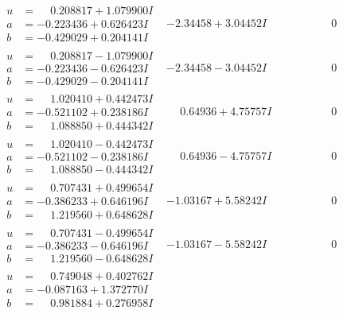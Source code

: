 \documentclass[1p]{elsarticle_modified}
\theoremstyle{definition}
\begin{document}
$$\begin{array}{c|c|c}
\begin{aligned}
u &= \phantom{-}0.208817 + 1.079900 I \\
a &= -0.223436 + 0.626423 I \\
b &= -0.429029 + 0.204141 I\end{aligned}
 & -2.34458 + 3.04452 I & \phantom{-0.000000 } 0 \\ \hline\begin{aligned}
u &= \phantom{-}0.208817 - 1.079900 I \\
a &= -0.223436 - 0.626423 I \\
b &= -0.429029 - 0.204141 I\end{aligned}
 & -2.34458 - 3.04452 I & \phantom{-0.000000 } 0 \\ \hline\begin{aligned}
u &= \phantom{-}1.020410 + 0.442473 I \\
a &= -0.521102 + 0.238186 I \\
b &= \phantom{-}1.088850 + 0.444342 I\end{aligned}
 & \phantom{-}0.64936 + 4.75757 I & \phantom{-0.000000 } 0 \\ \hline\begin{aligned}
u &= \phantom{-}1.020410 - 0.442473 I \\
a &= -0.521102 - 0.238186 I \\
b &= \phantom{-}1.088850 - 0.444342 I\end{aligned}
 & \phantom{-}0.64936 - 4.75757 I & \phantom{-0.000000 } 0 \\ \hline\begin{aligned}
u &= \phantom{-}0.707431 + 0.499654 I \\
a &= -0.386233 + 0.646196 I \\
b &= \phantom{-}1.219560 + 0.648628 I\end{aligned}
 & -1.03167 + 5.58242 I & \phantom{-0.000000 } 0 \\ \hline\begin{aligned}
u &= \phantom{-}0.707431 - 0.499654 I \\
a &= -0.386233 - 0.646196 I \\
b &= \phantom{-}1.219560 - 0.648628 I\end{aligned}
 & -1.03167 - 5.58242 I & \phantom{-0.000000 } 0 \\ \hline\begin{aligned}
u &= \phantom{-}0.749048 + 0.402762 I \\
a &= -0.087163 + 1.372770 I \\
b &= \phantom{-}0.981884 + 0.276958 I\end{aligned}

\end{array}$$
\end{document}
